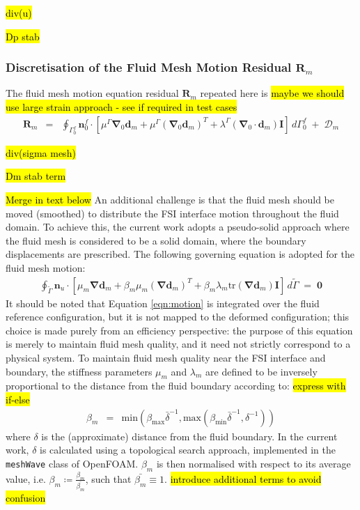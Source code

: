 \documentclass[sn-mathphys,Numbered]{sn-jnl}%
\newcommand{\bb}{\boldsymbol}
\begin{document}
\hl{div(u)}

\hl{Dp stab}

\subsubsection[Discretisation of the Fluid Mesh Motion Residual]{Discretisation of the Fluid Mesh Motion Residual $\bb{R}_m$}
The fluid mesh motion equation residual $\bb{R}_m$ repeated here is \hl{maybe we should use large strain approach - see if required in test cases}
\begin{eqnarray}
    \bb{R}_m
    &=&
    \oint_{\Gamma_0^f} \bb{n}_0^f \cdot
    \left[
    \mu^\Gamma \bb{\nabla}_0 \bb{d}_m + \mu^\Gamma \left(\bb{\nabla}_0 \bb{d}_m \right)^T
    + \lambda^\Gamma (\bb{\nabla}_0 \cdot \bb{d}_m) \textbf{I}
    \right]
    \, d\Gamma_0^f
    \;+\; \bb{\mathcal{D}}_m
\end{eqnarray}

\hl{div(sigma mesh)}

\hl{Dm stab term}


\hl{Merge in text below}
An additional challenge is that the fluid mesh should be moved (smoothed) to distribute the FSI interface motion throughout the fluid domain.
To achieve this, the current work adopts a pseudo-solid approach where the fluid mesh is considered to be a solid domain, where the boundary displacements are prescribed.
The following governing equation is adopted for the fluid mesh motion:
\begin{eqnarray} \label{eqn:motion}
    \oint_{\tilde{\Gamma}}
    \bb{n}_u \cdot \left[ \mu_m \bb{\nabla}\bb{d}_m
    + \beta_m \mu_m (\bb{\nabla}\bb{d}_m)^T
    + \beta_m \lambda_m \text{tr}(\bb{\nabla} \bb{d}_m)\textbf{I} \right] 
    \, d\tilde{\Gamma}
    \;=\; \bb{0}
\end{eqnarray}
It should be noted that Equation \ref{eqn:motion} is integrated over the fluid reference configuration, but it is not mapped to the deformed configuration; this choice is made purely from an efficiency perspective: the purpose of this equation is merely to maintain fluid mesh quality, and it need not strictly correspond to a physical system.
To maintain fluid mesh quality near the FSI interface and boundary, the stiffness parameters $\mu_m$ and $\lambda_m$ are defined to be inversely proportional to the distance from the fluid boundary according to:
\hl{express with if-else}
\begin{eqnarray}
	\beta_m &=& \text{min}(\beta_\text{max} \bar{\delta}^{-1}, \text{max}(\beta_\text{min} \bar{\delta}^{-1}, \delta^{-1}))
\end{eqnarray}
where $\delta$ is the (approximate) distance from the fluid boundary.
In the current work, $\delta$ is calculated using a topological search approach, implemented in the \texttt{meshWave} class of OpenFOAM.
$\beta_m$ is then normalised with respect to its average value, i.e. $\beta_m \coloneqq \frac{\beta_m}{\bar{\beta_m}}$, such that $\bar{\beta_m} \equiv 1$. \hl{introduce additional terms to avoid confusion}
\end{document}
